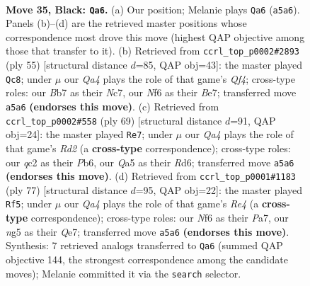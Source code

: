 \documentclass[11pt]{article}
\begin{document}
\clearpage

\begin{figure}[p]\centering
\begin{subfigure}{0.46\textwidth}\centering
\resizebox{\linewidth}{!}{%
\newchessgame
\chessboard[
  setfen={4rk2/1b2rp2/1p3n1P/qN1p2N1/P2P4/5KR1/2Q5/7R b - - 0 35},
  showmover=false,
  pgfstyle=straightmove, color=movearrow, markmove={a5-a6}
]}
\caption{}
\end{subfigure}\hfill
\begin{subfigure}{0.46\textwidth}\centering
\resizebox{\linewidth}{!}{%
\newchessgame
\chessboard[
  setfen={3r1r1k/1pn1b1pp/2p5/2P2q2/1P2NN2/6P1/Q6P/4RRK1 b - - 5 28},
  showmover=false,
  pgfstyle=straightmove, color=movearrow, markmove={f5-c8}
]}
\caption{}
\end{subfigure}
\\[4pt]
\begin{subfigure}{0.46\textwidth}\centering
\resizebox{\linewidth}{!}{%
\newchessgame
\chessboard[
  setfen={8/p1Nr1kp1/1p1r1p2/3Pn3/PP5p/2R1K2P/6P1/3R4 b - - 1 35},
  showmover=false,
  pgfstyle=straightmove, color=movearrow, markmove={d7-e7}
]}
\caption{}
\end{subfigure}\hfill
\begin{subfigure}{0.46\textwidth}\centering
\resizebox{\linewidth}{!}{%
\newchessgame
\chessboard[
  setfen={8/p3q1bk/P1p3pp/1n1rr3/4N3/1R1P3P/5BP1/2Q2R1K b - - 0 39},
  showmover=false,
  pgfstyle=straightmove, color=movearrow, markmove={e5-f5}
]}
\caption{}
\end{subfigure}
\caption{\textbf{Move 35, Black: \texttt{Qa6}.} (a) Our position; Melanie plays \texttt{Qa6} (\texttt{a5a6}). Panels (b)--(d) are the retrieved master positions whose correspondence most drove this move (highest QAP objective among those that transfer to it). (b) Retrieved from \texttt{ccrl\_top\_p0002\#2893} (ply 55) [structural distance $d$=85, QAP obj=43]: the master played \texttt{Qc8}; under $\mu$ our \emph{Qa4} plays the role of that game's \emph{Qf4}; cross-type roles: our \emph{B}b7 as their \emph{N}c7, our \emph{N}f6 as their \emph{B}e7; transferred move \texttt{a5a6} \textbf{(endorses this move)}. (c) Retrieved from \texttt{ccrl\_top\_p0002\#558} (ply 69) [structural distance $d$=91, QAP obj=24]: the master played \texttt{Re7}; under $\mu$ our \emph{Qa4} plays the role of that game's \emph{Rd2} (a \textbf{cross-type} correspondence); cross-type roles: our \emph{q}c2 as their \emph{P}b6, our \emph{Q}a5 as their \emph{R}d6; transferred move \texttt{a5a6} \textbf{(endorses this move)}. (d) Retrieved from \texttt{ccrl\_top\_p0001\#1183} (ply 77) [structural distance $d$=95, QAP obj=22]: the master played \texttt{Rf5}; under $\mu$ our \emph{Qa4} plays the role of that game's \emph{Re4} (a \textbf{cross-type} correspondence); cross-type roles: our \emph{N}f6 as their \emph{P}a7, our \emph{n}g5 as their \emph{Q}e7; transferred move \texttt{a5a6} \textbf{(endorses this move)}. Synthesis: 7 retrieved analogs transferred to \texttt{Qa6} (summed QAP objective 144, the strongest correspondence among the candidate moves); Melanie committed it via the \texttt{search} selector.}
\label{fig:thought-m69}
\end{figure}
\end{document}

